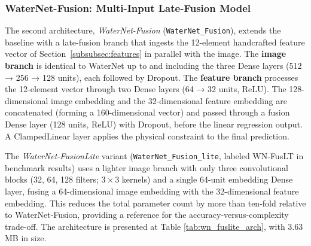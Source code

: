 \subsubsection{WaterNet-Fusion: Multi-Input Late-Fusion Model}
\label{subsubsec:waternet_fusion}

The second architecture, \textit{WaterNet-Fusion} (\texttt{WaterNet\_Fusion}), extends the baseline with a late-fusion branch that ingests the 12-element handcrafted feature vector of Section~\ref{subsubsec:features} in parallel with the image. The \textbf{image branch} is identical to WaterNet up to and including the three Dense layers (512 → 256 → 128 units), each followed by Dropout. The \textbf{feature branch} processes the 12-element vector through two Dense layers (64 → 32 units, ReLU). The 128-dimensional image embedding and the 32-dimensional feature embedding are concatenated (forming a 160-dimensional vector) and passed through a fusion Dense layer (128 units, ReLU) with Dropout, before the linear regression output. A ClampedLinear layer applies the physical constraint to the final prediction.

The \textit{WaterNet-FusionLite} variant (\texttt{WaterNet\_Fusion\_lite}, labeled WN-FusLT in benchmark results) uses a lighter image branch with only three convolutional blocks (32, 64, 128 filters; $3\times3$ kernels) and a single 64-unit embedding Dense layer, fusing a 64-dimensional image embedding with the 32-dimensional feature embedding. This reduces the total parameter count by more than ten-fold relative to WaterNet-Fusion, providing a reference for the accuracy-versus-complexity trade-off. The architecture is presented at Table \ref{tab:wn_fuslite_arch}, with 3.63 MB in size.

